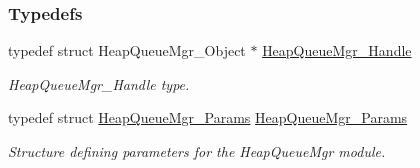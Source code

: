 \subsubsection*{Typedefs}
\begin{DoxyCompactItemize}
\item 
typedef struct HeapQueueMgr\_\-Object $\ast$ \hyperlink{_heap_queue_mgr_8h_a2ef82b5fb989b7b4bfddf91e742e65a8}{HeapQueueMgr\_\-Handle}
\begin{DoxyCompactList}\small\item\em HeapQueueMgr\_\-Handle type. \item\end{DoxyCompactList}\item 
typedef struct \hyperlink{struct_heap_queue_mgr___params}{HeapQueueMgr\_\-Params} \hyperlink{_heap_queue_mgr_8h_afc98922caa4949f131731d63867e9f81}{HeapQueueMgr\_\-Params}
\begin{DoxyCompactList}\small\item\em Structure defining parameters for the HeapQueueMgr module. \item\end{DoxyCompactList}\end{DoxyCompactItemize}
